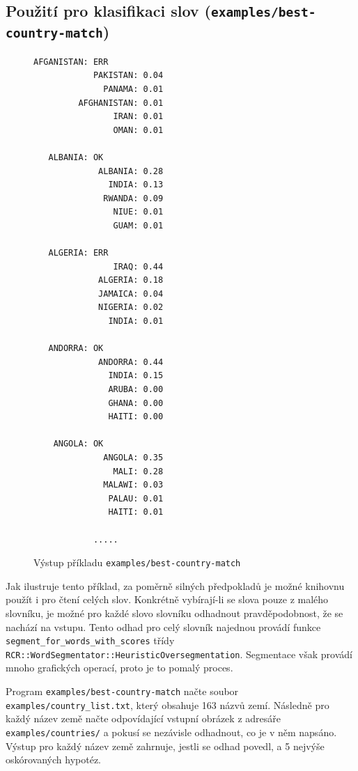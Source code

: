 \documentclass[a4paper]{article}
\begin{document}
\subsection{Použití pro klasifikaci slov (\texttt{examples/best-country-match})}
\begin{figure}
\begin{lstlisting}
AFGANISTAN: ERR
            PAKISTAN: 0.04
              PANAMA: 0.01
         AFGHANISTAN: 0.01
                IRAN: 0.01
                OMAN: 0.01

   ALBANIA: OK
             ALBANIA: 0.28
               INDIA: 0.13
              RWANDA: 0.09
                NIUE: 0.01
                GUAM: 0.01

   ALGERIA: ERR
                IRAQ: 0.44
             ALGERIA: 0.18
             JAMAICA: 0.04
             NIGERIA: 0.02
               INDIA: 0.01

   ANDORRA: OK
             ANDORRA: 0.44
               INDIA: 0.15
               ARUBA: 0.00
               GHANA: 0.00
               HAITI: 0.00

    ANGOLA: OK
              ANGOLA: 0.35
                MALI: 0.28
              MALAWI: 0.03
               PALAU: 0.01
               HAITI: 0.01

            .....
\end{lstlisting}
\caption{Výstup příkladu \texttt{examples/best-country-match}}
\end{figure}

Jak ilustruje tento příklad, za poměrně silných předpokladů je možné knihovnu
použít i pro čtení celých slov. Konkrétně vybírají-li se slova pouze z
malého slovníku, je možné pro každé slovo slovníku odhadnout pravděpodobnost,
že se nachází na vstupu. Tento odhad pro celý slovník najednou provádí funkce
\texttt{segment\_for\_words\_with\_scores} třídy
\texttt{RCR::WordSegmentator::HeuristicOversegmentation}.
Segmentace však provádí mnoho grafických operací, proto je to pomalý proces.

Program \texttt{examples/best-country-match} načte soubor
\texttt{examples/country\_list.txt}, který obsahuje 163 názvů zemí.
Následně pro každý název země načte odpovídající vstupní obrázek z adresáře
\texttt{examples/countries/} a pokusí se nezávisle odhadnout, co je v něm
napsáno. Výstup pro každý název země zahrnuje, jestli se odhad povedl, a
5 nejvýše oskórovaných hypotéz.
\end{document}
